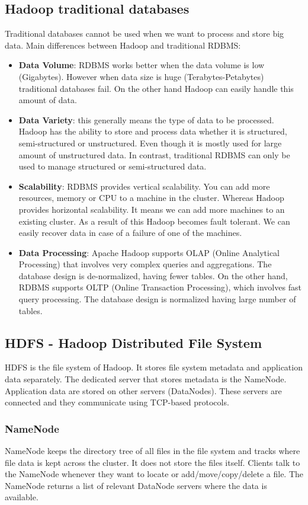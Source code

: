 \subsection{Hadoop \vs traditional databases}
Traditional databases cannot be used when we want to process and store big data. Main differences between Hadoop and traditional RDBMS:
\begin{itemize}
	\item \textbf{Data Volume}: RDBMS works better when the data volume is low (Gigabytes). However when data size is huge (Terabytes-Petabytes) traditional databases fail. On the other hand Hadoop can easily handle this amount of data.
	\item \textbf{Data Variety}: this generally means the type of data to be processed. Hadoop has the ability to store and process data whether it is structured, semi-structured or unstructured. Even though  it is mostly used for large amount of unstructured data. 
	In contrast, traditional RDBMS can only be used to manage structured or semi-structured data. 
	\item \textbf{Scalability}: RDBMS provides vertical scalability. You can add more resources, memory or CPU to a machine in the cluster. Whereas Hadoop provides horizontal scalability. It means we can add more machines to an existing cluster. As a result of this Hadoop becomes fault tolerant. We can easily recover data in case of a failure of one of the machines.
	\item \textbf{Data Processing}: Apache Hadoop supports OLAP (Online Analytical Processing) that involves very complex queries and aggregations. The database design is de-normalized, having fewer tables. On the other hand, RDBMS supports OLTP (Online Transaction Processing), which involves fast query processing. The database design is normalized having large number of tables. \cite{Hadoop-vs-RDBMS}
\end{itemize}
\subsection{HDFS - Hadoop Distributed File System \cite{Shvachko:2010:HDF:1913798.1914427}}
HDFS is the file system of Hadoop. It stores file system metadata and application data separately. The dedicated server that stores metadata is the NameNode. Application data are stored on other servers (DataNodes). These servers are connected and they communicate using TCP-based protocols. 
\subsubsection*{NameNode \cite{Secondary-NameNode}}
NameNode keeps the directory tree of all files in the file system and tracks where file data is kept across the cluster. It does not store the files itself. Clients talk to the NameNode whenever they want to locate or add/move/copy/delete a file. The NameNode returns a list of relevant DataNode servers where the data is available. 

